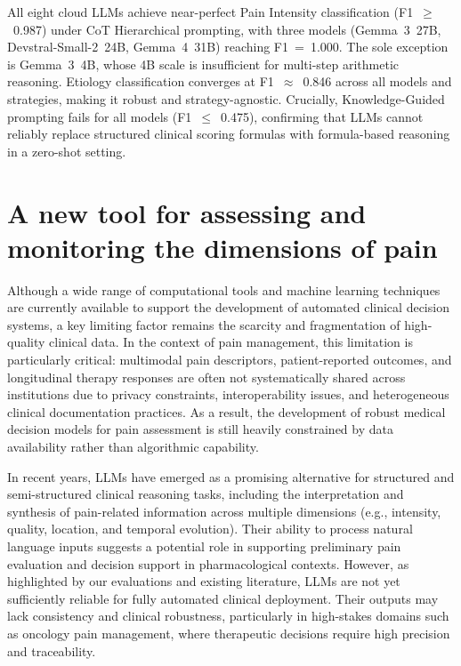 \documentclass[preprint,12pt,authoryear]{elsarticle}
\begin{document}
\begin{tcolorbox}
[colback=blue!5!white, colframe=blue!50!black, fonttitle=\bfseries, title=Answer to RQ3, fontupper=\setstretch{0.7}]
All eight cloud LLMs achieve near-perfect Pain Intensity classification (F1~$\geq$~0.987) under CoT Hierarchical prompting, with three models (Gemma~3~27B, Devstral-Small-2~24B, Gemma~4~31B) reaching F1~=~1.000. The sole exception is Gemma~3~4B, whose 4B scale is insufficient for multi-step arithmetic reasoning. Etiology classification converges at F1~$\approx$~0.846 across all models and strategies, making it robust and strategy-agnostic. Crucially, Knowledge-Guided prompting fails for all models (F1~$\leq$~0.475), confirming that LLMs cannot reliably replace structured clinical scoring formulas with formula-based reasoning in a zero-shot setting.
\end{tcolorbox}

\section{A new tool for assessing and monitoring the dimensions of pain\label{sec:sec4}}
Although a wide range of computational tools and machine learning techniques are currently available to support the development of automated clinical decision systems, a key limiting factor remains the scarcity and fragmentation of high-quality clinical data. In the context of pain management, this limitation is particularly critical: multimodal pain descriptors, patient-reported outcomes, and longitudinal therapy responses are often not systematically shared across institutions due to privacy constraints, interoperability issues, and heterogeneous clinical documentation practices. As a result, the development of robust medical decision models for pain assessment is still heavily constrained by data availability rather than algorithmic capability.

In recent years, LLMs have emerged as a promising alternative for structured and semi-structured clinical reasoning tasks, including the interpretation and synthesis of pain-related information across multiple dimensions (e.g., intensity, quality, location, and temporal evolution). Their ability to process natural language inputs suggests a potential role in supporting preliminary pain evaluation and decision support in pharmacological contexts. However, as highlighted by our evaluations and existing literature, LLMs are not yet sufficiently reliable for fully automated clinical deployment. Their outputs may lack consistency and clinical robustness, particularly in high-stakes domains such as oncology pain management, where therapeutic decisions require high precision and traceability.
\end{document}
